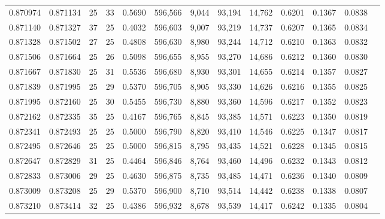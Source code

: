 \begin{tabular}{rrrrrrrrrrrrr}
0.870974 & 0.871134 &    25 &  33 &                                     0.5690 & 596,566 &   9,044 &  93,194 &  14,762 & 0.6201 & 0.1367 & 0.0838 \\
0.871140 & 0.871327 &    37 &  25 &                                     0.4032 & 596,603 &   9,007 &  93,219 &  14,737 & 0.6207 & 0.1365 & 0.0834 \\
0.871328 & 0.871502 &    27 &  25 &                                     0.4808 & 596,630 &   8,980 &  93,244 &  14,712 & 0.6210 & 0.1363 & 0.0832 \\
0.871506 & 0.871664 &    25 &  26 &                                     0.5098 & 596,655 &   8,955 &  93,270 &  14,686 & 0.6212 & 0.1360 & 0.0830 \\
0.871667 & 0.871830 &    25 &  31 &                                     0.5536 & 596,680 &   8,930 &  93,301 &  14,655 & 0.6214 & 0.1357 & 0.0827 \\
0.871839 & 0.871995 &    25 &  29 &                                     0.5370 & 596,705 &   8,905 &  93,330 &  14,626 & 0.6216 & 0.1355 & 0.0825 \\
0.871995 & 0.872160 &    25 &  30 &                                     0.5455 & 596,730 &   8,880 &  93,360 &  14,596 & 0.6217 & 0.1352 & 0.0823 \\
0.872162 & 0.872335 &    35 &  25 &                                     0.4167 & 596,765 &   8,845 &  93,385 &  14,571 & 0.6223 & 0.1350 & 0.0819 \\
0.872341 & 0.872493 &    25 &  25 &                                     0.5000 & 596,790 &   8,820 &  93,410 &  14,546 & 0.6225 & 0.1347 & 0.0817 \\
0.872495 & 0.872646 &    25 &  25 &                                     0.5000 & 596,815 &   8,795 &  93,435 &  14,521 & 0.6228 & 0.1345 & 0.0815 \\
0.872647 & 0.872829 &    31 &  25 &                                     0.4464 & 596,846 &   8,764 &  93,460 &  14,496 & 0.6232 & 0.1343 & 0.0812 \\
0.872833 & 0.873006 &    29 &  25 &                                     0.4630 & 596,875 &   8,735 &  93,485 &  14,471 & 0.6236 & 0.1340 & 0.0809 \\
0.873009 & 0.873208 &    25 &  29 &                                     0.5370 & 596,900 &   8,710 &  93,514 &  14,442 & 0.6238 & 0.1338 & 0.0807 \\
0.873210 & 0.873414 &    32 &  25 &                                     0.4386 & 596,932 &   8,678 &  93,539 &  14,417 & 0.6242 & 0.1335 & 0.0804 \\

\end{tabular}

